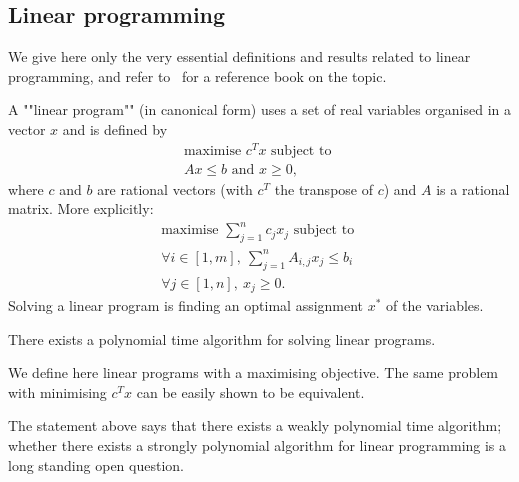 \subsection*{Linear programming}
We give here only the very essential definitions and results related to linear programming,
and refer to~\cite{Bertsimas&Tsitsiklis:1997} for a reference book on the topic.

A ""linear program"" (in canonical form) uses a set of real variables organised in a vector $x$ and is defined by
\[
\begin{array}{l}
\text{maximise } c^T x \text{ subject to } \\
A x \le b \text{ and } x \ge 0,
\end{array}
\]
where $c$ and $b$ are rational vectors (with $c^T$ the transpose of $c$) and $A$ is a rational matrix. 
More explicitly: 
\[
\begin{array}{l}
\text{maximise } \sum_{j = 1}^n c_j x_j \text{ subject to } \\
\forall i \in [1,m],\ \sum_{j = 1}^n A_{i,j} x_j \le b_i \\
\forall j \in [1,n],\ x_j \ge 0.
\end{array}
\]
Solving a linear program is finding an optimal assignment $x^*$ of the variables.

\begin{theorem}
There exists a polynomial time algorithm for solving linear programs.
\end{theorem}
We define here linear programs with a maximising objective. 
The same problem with minimising $c^T x$ can be easily shown to be equivalent.

The statement above says that there exists a weakly polynomial time algorithm; whether there exists a strongly polynomial algorithm for linear programming is a long standing open question.

